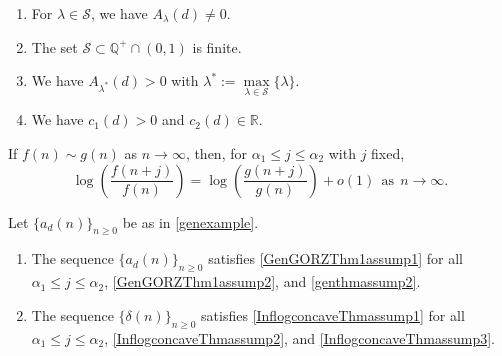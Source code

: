 \documentclass[10pt,a4paper]{amsart}
\renewcommand{\a}{\alpha}
\renewcommand{\d}{{\delta}}
\renewcommand{\l}{\lambda}
\begin{document}
\begin{enumerate}[label=(C\arabic*), start=7,  labelwidth=\widthof{(C99)}, %
	leftmargin=\labelwidth+\labelsep, %
	align=left]
		\item \label{genexampleassump1} For $\l\in \mathcal{S}$, we have $A_{\l}(d)\neq 0$.
	\item \label{genexampleassump2} The set $\mathcal{S}\subset\mathbb{Q}^{+}\cap (0,1)$ is finite.
	\item \label{genexampleassump3} We have $A_{\l^{*}}(d)>0$ with $\l^{*}:=\underset{\l \in \mathcal{S}}{\max}\{\l \}$.
	\item \label{genexampleassump4} We have $c_1(d)>0$ and $c_2(d)\in \mathbb{R}$.
\end{enumerate} 

\begin{lemma}\label{Fact1}
	If $f(n)\sim g(n)$ as $n\to \infty$, then, for $\a_1\le j\le \a_2$ %
	 with $j$ fixed, 
	\[
	\log\left(\frac{f(n+j)}{f(n)}\right)=\log\left(\frac{g(n+j)}{g(n)}\right)+o(1)\ \ \text{as}\ \ n\to\infty.
	\]
\end{lemma}

\begin{lemma}\label{fact2}
Let $\{a_d(n)\}_{n\ge 0}$ be as in \eqref{genexample}. 
\begin{enumerate}
	\item \label{fact2part1} The sequence $\{a_d(n)\}_{n\ge 0}$ satisfies {\rm{\ref{GenGORZThm1assump1}}} for all $\a_1\le j\le \a_2$, {\rm{\ref{GenGORZThm1assump2}}}, and {\rm{\ref{genthmassump2}}}.
	\item \label{fact2part2} The sequence $\{\d(n)\}_{n\ge 0}$ satisfies {\rm{\ref{InflogconcaveThmassump1}}} for all $\a_1\le j\le \a_2$, {\rm{\ref{InflogconcaveThmassump2}}}, and {\rm{\ref{InflogconcaveThmassump3}}}. 
\end{enumerate}
\end{lemma}
\end{document}
